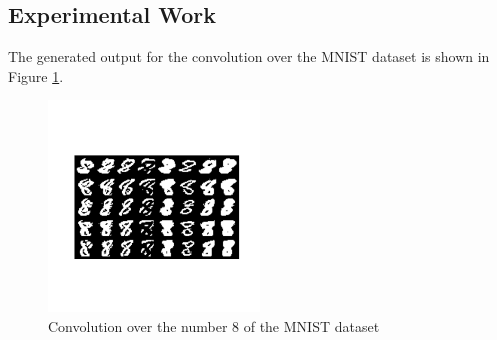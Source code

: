 \documentclass[3p,times,procedia]{elsarticle}
\begin{document}
\subsection{\textbf{Experimental Work}}
The generated output for the convolution over the MNIST dataset is shown in Figure \ref{fig:output}.



\begin{figure}[H]
    \centering
    \includegraphics[width=0.5\textwidth, trim={0 5cm 0 5cm}]{figures/output.png}
    \caption{Convolution over the number 8 of the MNIST dataset}
    \label{fig:output}
\end{figure}

\vspace{-0.5cm}
\end{document}
